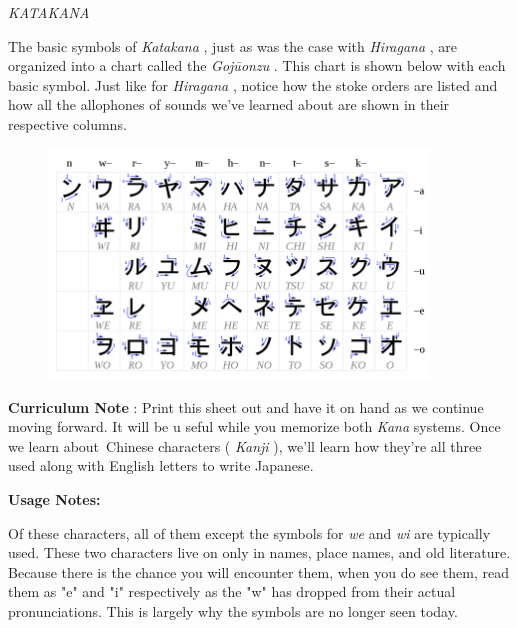 \begin{center}
\emph{KATAKANA }
\end{center}

\par{ The basic symbols of \emph{Katakana }, just as was the case with \emph{Hiragana }, are organized into a chart called the \emph{Gojūonzu }. This chart is shown below with each basic symbol. Just like for \emph{Hiragana }, notice how the stoke orders are listed and how all the allophones of sounds we've learned about are shown in their respective columns. }
 
\begin{figure}[h]
\centering

\includegraphics[width=0.9\textwidth]{figs/第01章/第4課:_katakana_fig/768px_Table_katakana.svg.png}

\end{figure}

\par{\textbf{Curriculum Note }: Print this sheet out and have it on hand as we continue moving forward. It will be u seful while you memorize both \emph{Kana }systems. Once we learn about Chinese characters ( \emph{Kanji }), we'll learn how they're all three used along with English letters to write Japanese. }

\par{\textbf{Usage Notes: }}

\par{  Of these characters, all of them except the symbols for \emph{we }and \emph{wi }\emph{ }are typically used. These two characters live on only in names, place names, and old literature. Because there is the chance you will encounter them, when you do see them, read them as "e" and "i" respectively as the "w" has dropped from their actual pronunciations. This is largely why the symbols are no longer seen today. }

